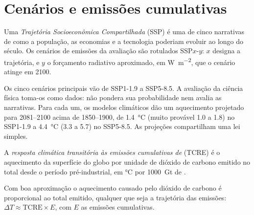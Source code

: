 \section{Cenários e emissões cumulativas}\label{sec:b2:anthropogenic-climate-change:scenarios}

\begin{definition}\label{def:b2:anthropogenic-climate-change:ssp}
Uma \emph{Trajetória Socioeconômica Compartilhada} (SSP) é uma de cinco
narrativas de como a população, as economias e a tecnologia poderiam evoluir ao longo do século. Os
cenários de emissões da avaliação são rotulados SSP$x$-$y$: $x$ designa a trajetória, e $y$ o
forçamento radiativo aproximado, em \unit{W.m^{-2}}, que o cenário atinge em 2100.
\end{definition}

Os cinco cenários principais vão de SSP1-1.9 a SSP5-8.5. A avaliação da ciência física toma-os como
dados: não pondera sua probabilidade nem avalia as narrativas. Para cada um, os modelos climáticos
dão um aquecimento projetado para 2081--2100 acima de 1850--1900, de \qty{1.4}{\celsius} (muito provável 1.0
a 1.8) no SSP1-1.9 a \qty{4.4}{\celsius} (3.3 a 5.7) no SSP5-8.5. As projeções compartilham uma
lei simples.

\begin{definition}\label{def:b2:anthropogenic-climate-change:tcre}
A \emph{resposta climática transitória às emissões cumulativas de }
(TCRE) é o aquecimento da superfície do globo por unidade de dióxido de carbono
emitido no total desde o período pré-industrial, em \unit{\celsius} por
\qty{1000}{Gt} de .
\end{definition}

\begin{proposition}\label{prop:b2:anthropogenic-climate-change:tcre}
Com boa aproximação o aquecimento causado pelo dióxido de carbono é proporcional ao total emitido,
qualquer que seja a trajetória das emissões: $\Delta T \approx \text{TCRE} \times E$, com $E$ as emissões
cumulativas.
\end{proposition}
\admitted

